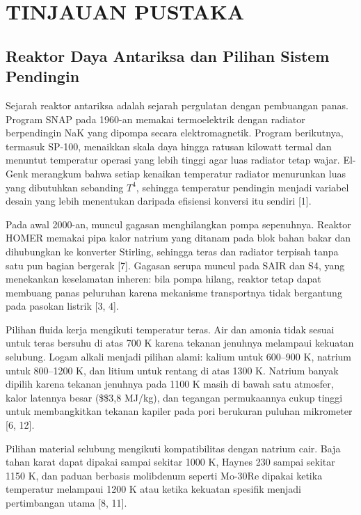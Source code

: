 \documentclass[
  indonesian,
  12pt,
  a4paper,
]{report}
\begin{document}
\chapter{TINJAUAN PUSTAKA}\label{tinjauan-pustaka}

\section{Reaktor Daya Antariksa dan Pilihan Sistem
Pendingin}\label{reaktor-daya-antariksa-dan-pilihan-sistem-pendingin}

Sejarah reaktor antariksa adalah sejarah pergulatan dengan pembuangan
panas. Program SNAP pada 1960-an memakai termoelektrik dengan radiator
berpendingin NaK yang dipompa secara elektromagnetik. Program
berikutnya, termasuk SP-100, menaikkan skala daya hingga ratusan
kilowatt termal dan menuntut temperatur operasi yang lebih tinggi agar
luas radiator tetap wajar. El-Genk merangkum bahwa setiap kenaikan
temperatur radiator menurunkan luas yang dibutuhkan sebanding \(T^4\),
sehingga temperatur pendingin menjadi variabel desain yang lebih
menentukan daripada efisiensi konversi itu sendiri {[}1{]}.

Pada awal 2000-an, muncul gagasan menghilangkan pompa sepenuhnya.
Reaktor HOMER memakai pipa kalor natrium yang ditanam pada blok bahan
bakar dan dihubungkan ke konverter Stirling, sehingga teras dan radiator
terpisah tanpa satu pun bagian bergerak {[}7{]}. Gagasan serupa muncul
pada SAIR dan S4, yang menekankan keselamatan inheren: bila pompa
hilang, reaktor tetap dapat membuang panas peluruhan karena mekanisme
transportnya tidak bergantung pada pasokan listrik {[}3, 4{]}.

Pilihan fluida kerja mengikuti temperatur teras. Air dan amonia tidak
sesuai untuk teras bersuhu di atas 700 K karena tekanan jenuhnya
melampaui kekuatan selubung. Logam alkali menjadi pilihan alami: kalium
untuk 600--900 K, natrium untuk 800--1200 K, dan litium untuk rentang di
atas 1300 K. Natrium banyak dipilih karena tekanan jenuhnya pada 1100 K
masih di bawah satu atmosfer, kalor latennya besar (\$\pm\$3,8 MJ/kg),
dan tegangan permukaannya cukup tinggi untuk membangkitkan tekanan
kapiler pada pori berukuran puluhan mikrometer {[}6, 12{]}.

Pilihan material selubung mengikuti kompatibilitas dengan natrium cair.
Baja tahan karat dapat dipakai sampai sekitar 1000 K, Haynes 230 sampai
sekitar 1150 K, dan paduan berbasis molibdenum seperti Mo-30Re dipakai
ketika temperatur melampaui 1200 K atau ketika kekuatan spesifik menjadi
pertimbangan utama {[}8, 11{]}.
\end{document}

